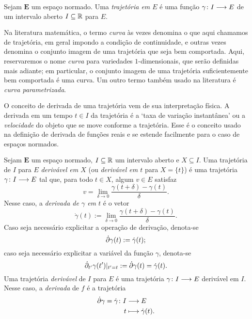 \begin{definition}
Sejam $\bm E$ um espaço normado. Uma \emph{trajetória em $E$} é uma função ${\gamma}\colon {I} \longrightarrow {E}$ de um intervalo aberto $I \subseteq \mathbb{R}$ para $E$.
\end{definition}

Na literatura matemática, o termo \textit{curva} às vezes denomina o que aqui chamamos de trajetória, em geral impondo a condição de continuidade, e outras vezes denomina o conjunto imagem de uma trajetória que seja bem comportada. Aqui, reservaremos o nome \textit{curva} para variedades $1$-dimensionais, que serão definidas mais adiante; em particular, o conjunto imagem de uma trajetória suficientemente bem comportada é uma curva. Um outro termo também usado na literatura é \textit{curva parametrizada}.

O conceito de derivada de uma trajetória vem de sua interpretação física. A derivada em um tempo $t \in I$ da trajetória é a `taxa de variação instantânea' ou a \emph{velocidade} do objeto que se move conforme a trajetória. Esse é o conceito usado na definição de derivada de funções reais e se estende facilmente para o caso de espaços normados.

\begin{definition}[Derivabilidade]
Sejam $\bm E$ um espaço normado, $I \subseteq \mathbb{R}$ um intervalo aberto e $X \subseteq I$. Uma trajetória de $I$ para $E$ \emph{derivável em $X$} (ou \emph{derivável em $t$} para $X=\{t\}$) é uma trajetória ${\gamma}\colon {I} \longrightarrow {E}$ tal que, para todo $t \in X$, algum $v \in E$ satisfaz
	\begin{equation*}
	v = \lim_{\delta \to 0} \frac{\gamma(t+\delta)-\gamma(t)}{\delta}.
	\end{equation*}
Nesse caso, a \emph{derivada de $\gamma$ em $t$} é o vetor
	\begin{equation*}
	\dot{\gamma} (t) := \lim_{\delta \to 0} \frac{\gamma(t+\delta)-\gamma(t)}{\delta}.
	\end{equation*}
Caso seja necessário explicitar a operação de derivação, denota-se
	\begin{equation*}
	\dot{\partial} \gamma(t) := \dot{\gamma} (t);
	\end{equation*}
caso seja necessário explicitar a variável da função $\gamma$, denota-se
	\begin{equation*}
	\dot{\partial}_{t'} \gamma(t')|_{t'=t} := \dot{\partial} \gamma(t) = \dot \gamma(t).
	\end{equation*}
Uma trajetória \emph{derivável} de $I$ para $E$ é uma trajetória ${\gamma}\colon {I} \longrightarrow {E}$ derivável em $I$. Nesse caso, a \emph{derivada} de $f$ é a trajetória
	\begin{align*}
	{\dot{\partial}\gamma = \dot \gamma}\colon {I} &\longrightarrow {E} \\{t} &\longmapsto \dot \gamma(t).
	\end{align*}
\end{definition}

